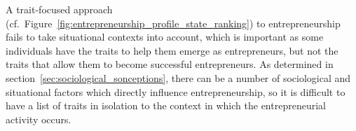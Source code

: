     A trait-focused approach (cf.\ Figure~\ref{fig:entrepreneurship_profile_state_ranking}) to entrepreneurship fails to take situational contexts into account, which is important as some individuals have the traits to help them emerge as entrepreneurs, but not the traits that allow them to become successful entrepreneurs. As determined in section~\ref{sec:sociological_sonceptions}, there can be a number of sociological and situational factors which directly influence entrepreneurship, so it is difficult to have a list of traits in isolation to the context in which the entrepreneurial activity occurs.
